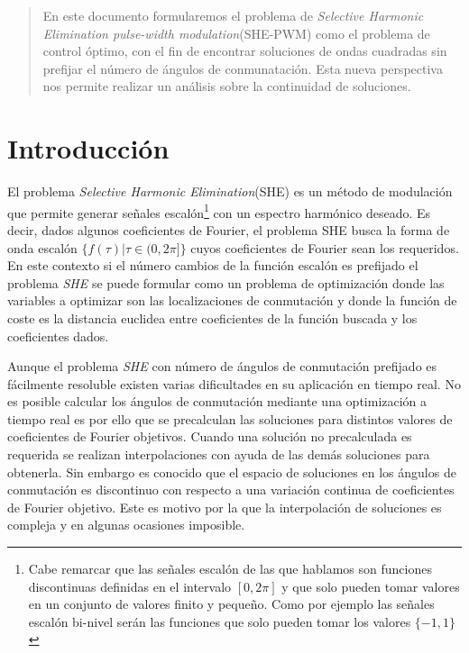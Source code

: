 
\begin{abstract}
    En este documento formularemos el problema de \emph{Selective Harmonic Elimination pulse-width modulation}(SHE-PWM) como el problema de control óptimo, con el fin de encontrar soluciones de ondas cuadradas sin prefijar el número de ángulos de conmunatación. Esta nueva perspectiva nos permite realizar un análisis sobre la continuidad de soluciones.
\end{abstract}
\tableofcontents

\section{Introducción} 

El problema \emph{Selective Harmonic Elimination}(SHE)  es un método de modulación que permite generar señales escalón\footnote{Cabe remarcar que las señales escalón de las que hablamos son funciones discontinuas definidas en el intervalo $[0,2\pi]$ y que solo pueden tomar valores en un conjunto de valores finito y pequeño. Como por ejemplo las señales escalón bi-nivel serán las funciones que solo pueden tomar los valores $\{-1,1\}$ }
con un espectro harmónico deseado.  
%
Es decir, dados algunos coeficientes de Fourier, el problema SHE busca la forma de onda escalón $\{f(\tau) | \tau \in (0,2\pi] \}$ cuyos coeficientes de Fourier sean los requeridos. 
%
En este contexto si el número cambios de la función escalón es prefijado el problema \emph{SHE} se puede formular como un problema de optimización donde las variables a optimizar son las localizaciones de conmutación y donde la función de coste es la distancia euclidea entre coeficientes de la función buscada y los coeficientes dados. 
\newline 

%
Aunque el problema \emph{SHE} con número de ángulos de conmutación prefijado es fácilmente resoluble  existen varias dificultades en su aplicación en tiempo real. 
%
No es posible calcular los ángulos de conmutación mediante una optimización a tiempo real es por ello que se precalculan las soluciones para distintos valores de coeficientes de Fourier objetivos.
%
Cuando una solución no precalculada es requerida se realizan interpolaciones con ayuda de las demás soluciones para obtenerla. 
%
Sin embargo es conocido que el espacio de soluciones en los ángulos de conmutación es discontinuo con respecto a una variación continua de coeficientes de Fourier objetivo. Este es motivo por la que la interpolación de soluciones es compleja y en algunas ocasiones imposible.
\newline

